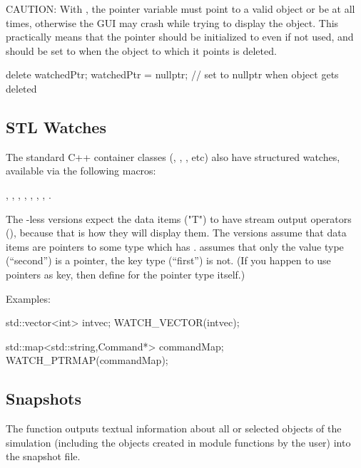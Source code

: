CAUTION: With , the pointer variable must point to a valid
object or be  at all times, otherwise the GUI may crash
while trying to display the object. This practically means that
the pointer should be initialized to  even if not used, and
should be set to  when the object to which it points is deleted.

\begin{cpp}
delete watchedPtr;
watchedPtr = nullptr;  // set to nullptr when object gets deleted
\end{cpp}


\subsection{STL Watches}
\label{sec:sim-lib:stl-watches}

The standard C++ container classes (, , , etc)
also have structured watches, available via the following macros:

, ,
, ,
, ,
, .

The -less versions expect the data items ("T") to have
stream output operators (), because that is how
they will display them. The  versions assume that
data items are pointers to some type which has .
 assumes that only the value type (``second'')
is a pointer, the key type (``first'') is not. (If you happen to use
pointers as key, then define  for the pointer type
itself.)

Examples:

\begin{cpp}
std::vector<int> intvec;
WATCH_VECTOR(intvec);

std::map<std::string,Command*> commandMap;
WATCH_PTRMAP(commandMap);
\end{cpp}



\subsection{Snapshots}
\label{sec:sim-lib:snapshots}

The  function outputs textual information about all
or selected objects of the simulation (including the objects created
in module functions by the user) into the snapshot file.

